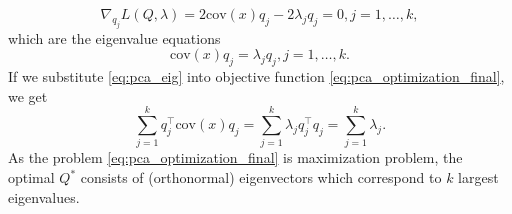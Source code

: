 \begin{equation}
    \nabla_{q_j}L(Q,\lambda) = 2 \text{cov}(x)q_j-2\lambda_jq_j=0, j=1,\dots,k,
\end{equation}
which are the eigenvalue equations
\begin{equation}
    \text{cov}(x)q_j=\lambda_j q_j, j=1,\dots,k.
    \label{eq:pca_eig}
\end{equation}
If we substitute \eqref{eq:pca_eig} into objective function \eqref{eq:pca_optimization_final}, we get
\begin{equation}
    \sum_{j=1}^k q_j^{\top} \text{cov}(x)q_j = \sum_{j=1}^k \lambda_j q_j^{\top}q_j = \sum_{j=1}^k \lambda_j.
\end{equation}
As the problem \eqref{eq:pca_optimization_final} is maximization problem, the optimal $Q^*$ consists of (orthonormal) eigenvectors which correspond to $k$ largest eigenvalues.

